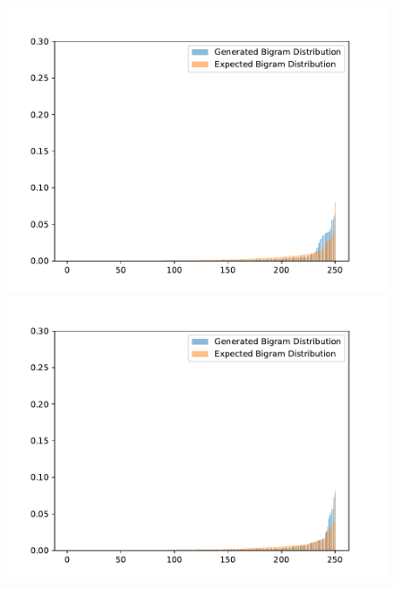 \begin{figure}[H]
	\includegraphics[width=\linewidth]{img/plots/reddit/bigram_distribution_comparison_step_500000.pdf}
	\centering
	\small
	\endminipage\hfill
	\includegraphics[width=\linewidth]{img/plots/reddit/bigram_distribution_comparison_step_1000000.pdf}
	\centering
	\small
	\endminipage\hfill

\end{figure}
